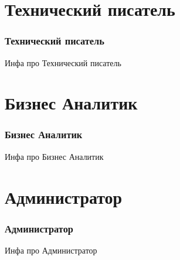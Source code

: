 \documentclass{../industrial-development}
\begin{document}
\section{Технический писатель }

\begin{frame} \frametitle{Технический писатель}
	\begin{block}{}
		\alert {}Инфа про Технический писатель
	\end{block}
	
\end{frame}

\section{Бизнес Аналитик }

\begin{frame} \frametitle{Бизнес Аналитик}
	\begin{block}{}
		\alert {}Инфа про Бизнес Аналитик
	\end{block}
	
\end{frame}

\section{Администратор} 

\begin{frame} \frametitle{Администратор}
	\begin{block}{}
		\alert {}Инфа про Администратор
	\end{block}
	
\end{frame}
\end{document}
